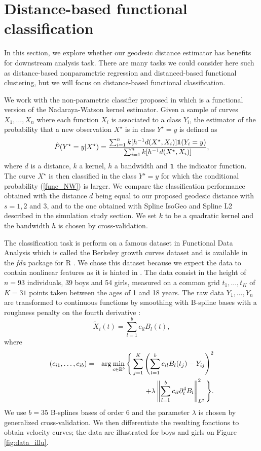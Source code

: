\section{Distance-based functional classification}\label{distance-based-functional-classification-marie}

In this section, we explore whether our geodesic distance estimator has
benefits for downstream analysis task. There are many tasks we could
consider here such as distance-based nonparametric regression and
distanced-based functional clustering, but we will focus on
distance-based functional classification. 

We work with the non-parametric classifier proposed in \cite{Ferraty2006} which is a functional version of the Nadaraya-Watson kernel estimator. Given a sample of curves $X_1,\ldots,X_n$ where each function $X_i$ is associated to a class $Y_i$, the estimator of the probability that a new observation $X^\star$ is in class $Y^\star=y$ is defined as
\begin{equation}\label{func_NW}
\hat P(Y^\star = y | X^\star)= \frac{ \sum_{i=1}^n k[h^{-1} d(X^\star,X_i)] {\bf{1}}(Y_i = y) }{ \sum_{i=1}^n k[h^{-1} d(X^\star,X_i)] },
\end{equation}
where $d$ is a distance, $k$ a kernel, $h$ a bandwidth and $\bf{1}$ the indicator function. The curve $X^\star$ is then classified in the class $Y^\star =y$ for which the conditional probability (\ref{func_NW}) is larger. We compare the classification performance obtained with the distance $d$ being equal to our proposed geodesic distance with $s=1,2$ and $3$, and to the one obtained with Spline IsoGeo and Spline L2 described in the simulation study section. We set $k$ to be a quadratic kernel and the bandwidth $h$ is chosen by cross-validation. 

The classification task is perform on a famous dataset in Functional Data Analysis which is called the Berkeley growth curves dataset and is available in the \emph{fda} package \cite{Ram-Hoo-Gra} for R \cite{Rproject}. We chose this dataset because we expect the data to contain nonlinear features as it is hinted in \cite{ChenMuller2012}. The data consist in the height of $n=93$ individuals, 39 boys and 54 girls, measured on a common grid $t_1,\ldots,t_K$ of $K=31$ points taken between the ages of 1 and 18 years. The raw data $Y_1,\ldots,Y_n$ are transformed to continuous functions by smoothing with B-spline bases with a roughness penalty on the fourth derivative :
$$\tilde X_i(t) = \sum_{l=1}^{b} c_{il}B_l(t), $$
where
 \begin{eqnarray*}
 (c_{i1},\ldots,c_{ib})&=&\arg \min_{c\in \mathbb{R}^b}\Bigg\{\sum_{j=1}^K\left(\sum_{l=1}^{b} c_{il}B_l(t_j)-Y_{ij}\right)^2\\
 &&\quad +\lambda \left\|\sum_{l=1}^{b} c_{il}\partial^4_tB_l\right\|^2_{L^2}\Bigg\}.
 \end{eqnarray*} 
We use $b=35$ B-splines bases of order 6 and the parameter $\lambda$ is chosen by generalized cross-validation. We then differentiate the resulting fonctions to obtain velocity curves; the data are illustrated for boys and girls on Figure \ref{fig:data_illu}.





